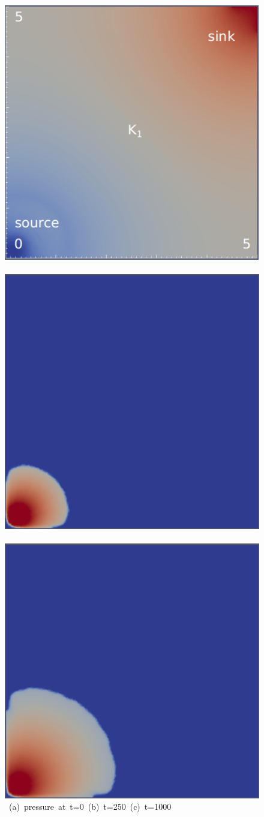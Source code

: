 \begin{landscape}
\begin{figure}[ht] 
\vbox{\vspace{-1cm}
\hbox{\includegraphics[width=.5\textwidth]{./Pics1/Saffman_homogeneous/saffman_homo_fixed_1.pdf}
      \includegraphics[width=.5\textwidth]{./Pics1/Saffman_homogeneous/saffman_homo_fixed_250_1.pdf}
      \includegraphics[width=.5\textwidth]{./Pics1/Saffman_homogeneous/saffman_homo_fixed_1000.pdf}}
\vspace{0.cm}
\hbox{\hspace{1.0cm} (a) pressure at t=0 \hspace{3.cm} (b) t=250 \hspace{3.0cm} (c) t=1000}
}
\end{figure}
\end{landscape}
